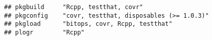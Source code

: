 \documentclass[]{book}
\begin{document}
\begin{verbatim}
## pkgbuild     "Rcpp, testthat, covr"                                                                                                                                                                                                                                                                                                                                                                                                                                                                                                                                                                                                                                                                                    
## pkgconfig    "covr, testthat, disposables (>= 1.0.3)"                                                                                                                                                                                                                                                                                                                                                                                                                                                                                                                                                                                                                                                                  
## pkgload      "bitops, covr, Rcpp, testthat"                                                                                                                                                                                                                                                                                                                                                                                                                                                                                                                                                                                                                                                                            
## plogr        "Rcpp"                                                                                                                                                                                                                                                                                                                                                                                                                                                                                                                                                                                                                                                                                                    

\end{verbatim}
\end{document}
